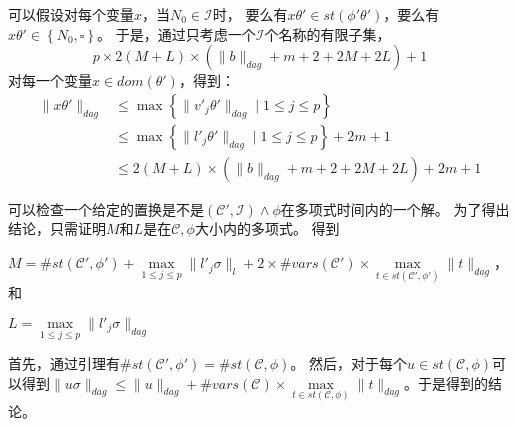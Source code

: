 可以假设对每个变量$x$，当$N_0\in \mathcal{I}$时，
要么有$x\theta'\in st(\phi'\theta')$，要么有$x\theta'\in\left\{ N_{0}, \square\right\} $。
于是，通过只考虑一个$\mathcal{I}$个名称的有限子集，
\[
p\times2(M+L)\times(\parallel b\parallel_{dag}+m+2+2M+2L)+1
\]
对每一个变量$x\in dom(\theta')$，得到：
\begin{equation}
\begin{split}
\parallel x\theta'\parallel_{dag}&\leq\max\left\{ \parallel v'_{j}\theta'\parallel_{dag}\mid1\leq j\leq p\right\} \\
&\leq\max\left\{ \parallel l'_{j}\theta'\parallel_{dag}\mid1\leq j\leq p\right\} +2m+1\\
&\leq2(M+L)\times(\parallel b\parallel_{dag}+m+2+2M+2L)+2m+1
\end{split}
\end{equation}

可以检查一个给定的置换是不是$(\mathcal{C'},\mathcal{I})\wedge \phi$在多项式时间内的一个解。
为了得出结论，只需证明$M$和$L$是在$\mathcal{C},\phi$大小内的多项式。
得到

$M=\#st(\mathcal{C}',\phi')+\underset{1\leq j\leq p}{\max}\parallel l'_{j}\sigma\parallel_{l}+2\times\#vars(\mathcal{C}')\times\underset{t\in st(\mathcal{C}',\phi')}{\max}\parallel t\parallel_{dag}$，和

$L=\underset{1\leq j\leq p}{\max}\parallel l'_{j}\sigma\parallel_{dag}$

首先，通过引理有$\#st(\mathcal{C}',\phi')=\#st(\mathcal{C},\phi)$。
然后，对于每个$u\in st(\mathcal{C},\phi)$可以得到$\parallel u\sigma\parallel_{dag}\leq\parallel u\parallel_{dag}+\#vars(\mathcal{C})\times\underset{t\in st(\mathcal{C},\phi)}{\max}\parallel t\parallel_{dag}$。于是得到的结论。




